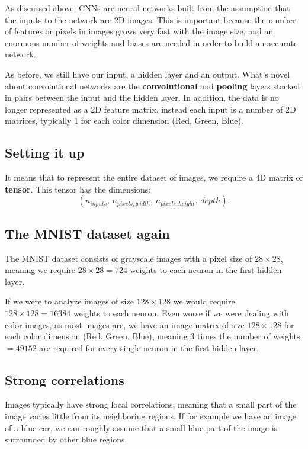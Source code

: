 \documentclass[%
oneside,                 %
final,                   %
10pt]{article}
\begin{document}
As discussed above, CNNs are neural networks built from the assumption that the inputs
to the network are 2D images. This is important because the number of features or pixels in images
grows very fast with the image size, and an enormous number of weights and biases are needed in order to build an accurate network.  

As before, we still have our input, a hidden layer and an output. What's novel about convolutional networks
are the \textbf{convolutional} and \textbf{pooling} layers stacked in pairs between the input and the hidden layer.
In addition, the data is no longer represented as a 2D feature matrix, instead each input is a number of 2D
matrices, typically 1 for each color dimension (Red, Green, Blue). 

\subsection{Setting it up}

It means that to represent the entire
dataset of images, we require a 4D matrix or \textbf{tensor}. This tensor has the dimensions:  
\[  
(n_{inputs},\, n_{pixels, width},\, n_{pixels, height},\, depth) .
\]

\subsection{The MNIST dataset again}

The MNIST dataset consists of grayscale images with a pixel size of
$28\times 28$, meaning we require $28 \times 28 = 724$ weights to each
neuron in the first hidden layer.

If we were to analyze images of size $128\times 128$ we would require
$128 \times 128 = 16384$ weights to each neuron. Even worse if we were
dealing with color images, as most images are, we have an image matrix
of size $128\times 128$ for each color dimension (Red, Green, Blue),
meaning 3 times the number of weights $= 49152$ are required for every
single neuron in the first hidden layer.


\subsection{Strong correlations}

Images typically have strong local correlations, meaning that a small
part of the image varies little from its neighboring regions. If for
example we have an image of a blue car, we can roughly assume that a
small blue part of the image is surrounded by other blue regions.
\end{document}
